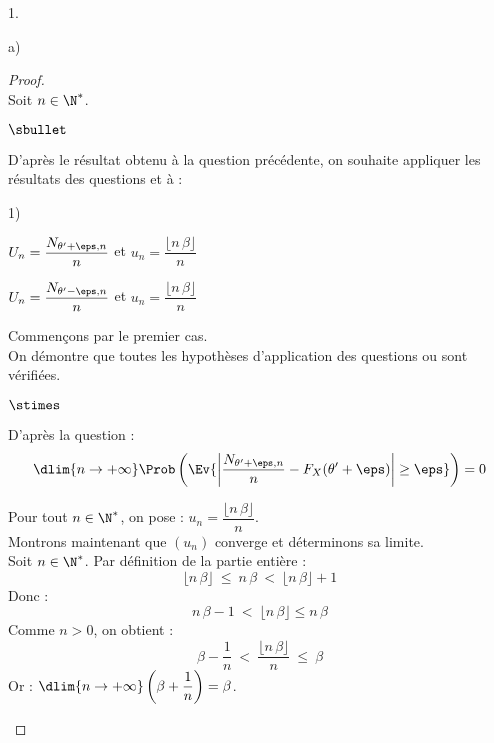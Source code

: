 \begin{noliste}{1.}
\begin{noliste}{a)}
    \begin{proof}~\\
    Soit $n\in \N^*$.
      \begin{noliste}{$\sbullet$}
	\item D'après le résultat obtenu à la question 
	précédente, on souhaite appliquer les résultats des questions 
	 et  à :
	\begin{noliste}{\scriptsize 1)}
	  \item $U_n = \dfrac{N_{\theta'+\eps,n}}{n}$ et $u_n = 
	  \dfrac{\lfloor n \, \beta \rfloor}{n}$
	  \item $U_n = \dfrac{N_{\theta'-\eps,n}}{n}$ et $u_n = 
	  \dfrac{\lfloor n \, \beta \rfloor}{n}$
	\end{noliste}
	Commençons par le premier cas.\\
	On démontre que toutes les hypothèses 
	d'application des questions  ou  sont 
	vérifiées.
	\begin{noliste}{$\stimes$}
	  \item D'après la question  :
	  \[
	    \dlim{n\to +\infty} \Prob\left( \Ev{ \left\vert
	    \dfrac{N_{\theta' + \eps,n}}{n} - F_X(\theta' +\eps) 
	    \right\vert \geq \eps}\right) = 0
	  \]
	  
	  
	  
	  \newpage
	  
	  
	  
	  \item Pour tout $n\in \N^*$, on pose : $u_n = 
	  \dfrac{\lfloor n\, \beta \rfloor}{n}$.\\
	  Montrons maintenant que $(u_n)$ converge 
	  et déterminons sa limite.\\
	  Soit $n\in\N^*$. Par définition de la partie entière :
	  \[
	    \lfloor n\, \beta \rfloor \ \leq \ n\, \beta \
	    < \ \lfloor n\, \beta \rfloor +1
	  \]
	  Donc :
	  \[
	    n\, \beta -1 \ < \ \lfloor n\, \beta \rfloor \leq n\, \beta
	  \]
	  Comme $n>0$, on obtient :
	  \[
	    \beta - \dfrac{1}{n} \ < \ \dfrac{\lfloor n\, \beta 
	    \rfloor}{n} \ \leq \ \beta
	  \]
	  Or : $\dlim{n\to +\infty} \left(\beta + \dfrac{1}{n} \right)
	  = \beta$.
	  

\end{noliste}
\end{noliste}
\end{proof}
\end{noliste}
\end{noliste}
